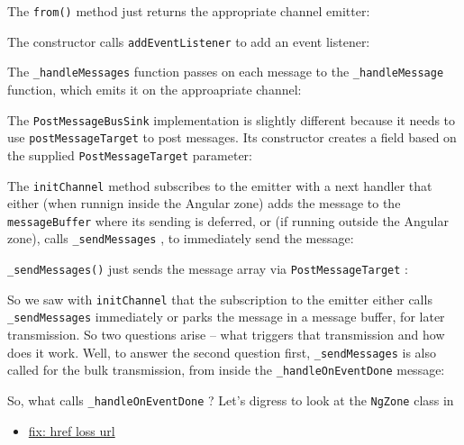 

The
\texttt{from()}
method just returns the appropriate channel emitter:



The constructor calls
\texttt{addEventListener}
to add an event listener:



The
\texttt{\_handleMessages}
function passes on each message to the
\texttt{\_handleMessage}
function, which emits it on the approapriate channel:



The
\texttt{PostMessageBusSink}
implementation is slightly different because it needs to use
\texttt{postMessageTarget}
to post messages. Its constructor creates a field based on the
supplied
\texttt{PostMessageTarget}
parameter:



The
\texttt{initChannel}
method subscribes to the emitter with a next handler that either
(when runnign inside the Angular zone) adds the message to the
\texttt{messageBuffer}
where its sending is deferred, or (if running outside the Angular zone), calls
\texttt{\_sendMessages}
, to immediately send the message:



\texttt{\_sendMessages()}
just sends the message array via
\texttt{PostMessageTarget}
:



So we saw with
\texttt{initChannel}
that the subscription to the emitter either calls
\texttt{\_sendMessages}
immediately or parks the message in a message buffer, for later
transmission. So two questions arise – what triggers that transmission and how does
it work. Well, to answer the second question first,
\texttt{\_sendMessages}
is also called for the
bulk transmission, from inside the
\texttt{\_handleOnEventDone}
message:



So, what calls
\texttt{\_handleOnEventDone}
? Let’s digress to look at the
\texttt{NgZone}
class in

\begin{itemize}
  \item \href{fix: href loss url}
        {fix: href loss url}
\end{itemize}


